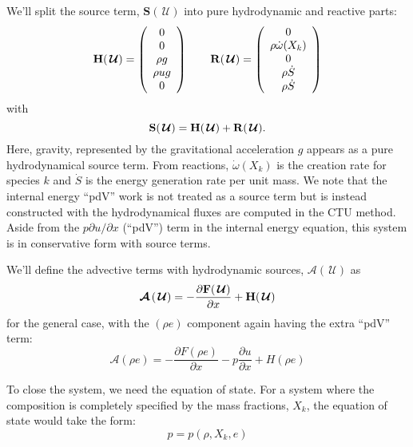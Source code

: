 \documentclass{aastex63}
\newcommand{\omegadot}{\dot{\omega}}
\newcommand{\ddx}[1]{{\frac{{\partial#1}}{\partial x}}}
\newcommand{\Uc}{{\,\bm{\mathcal{U}}}}
\newcommand{\Fb}{\mathbf{F}}
\newcommand{\Sc}{\mathbf{S}}
\newcommand{\Hb}{{\bf H}}
\newcommand{\Rb}{{\bf R}}
\newcommand{\Advs}[1]{\boldsymbol{\mathcal{A}} \left(#1\right)}
\begin{document}
We'll split the source term, $\Sc(\Uc)$ into pure hydrodynamic and reactive parts:
\begin{equation}
  \label{eq:cons_sources}
  \Hb(\Uc) = \left ( \begin{array}{c}
    0 \\
    0 \\
    \rho g \\
    \rho u g \\
    0 \end{array} \right )
  \qquad
  \Rb(\Uc) = \left ( \begin{array}{c}
     0 \\
     \rho \omegadot(X_k) \\
     0 \\
     \rho \dot{S} \\
     \rho \dot{S} 
  \end{array} \right )
\end{equation}
with 
\begin{equation}
  \Sc(\Uc) = \Hb(\Uc) + \Rb(\Uc).
\end{equation}
Here, gravity, represented by the gravitational acceleration $g$
appears as a pure hydrodynamical source term.  From reactions,
$\omegadot(X_k)$ is the creation rate for species $k$
 and $\dot{S}$ is the energy generation rate per unit
mass.  We note that the internal energy ``pdV'' work is not treated as
a source term but is instead constructed with the hydrodynamical
fluxes are computed in the CTU method.
Aside from the $p\partial u/\partial x$ (``pdV'') term in the internal
energy equation, this system is in conservative form with source
terms.

We'll define the advective terms with hydrodynamic sources, $\Advs{\Uc}$ as
\begin{equation}
\Advs{\Uc} = -\ddx{\Fb(\Uc)} + \Hb(\Uc)
\end{equation}
for the general case, with the $(\rho e)$ component again having the extra
``pdV'' term:
\begin{equation}
\mathcal{A}(\rho e) = -\ddx{F(\rho e)} -p \ddx{u} + H(\rho e)
\end{equation}


To close the system, we need the equation of state.  For a system
where the composition is completely specified by the mass fractions,
$X_k$, the equation of state would take the form:
\begin{equation}
p = p(\rho, X_k, e)
\end{equation}
\end{document}
